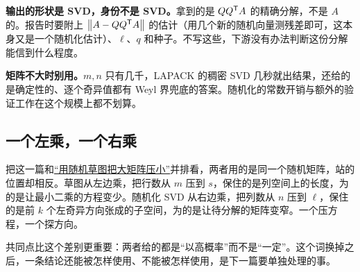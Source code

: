 \textbf{输出的形状是 SVD，身份不是 SVD。}拿到的是 \(QQ^{\mathsf{T}}A\) 的精确分解，不是 \(A\) 的。报告时要附上 \(\left\lVert A-QQ^{\mathsf{T}}A\right\rVert\) 的估计（用几个新的随机向量测残差即可，这本身又是一个随机化估计）、\(\ell\)、\(q\) 和种子。不写这些，下游没有办法判断这份分解能信到什么程度。

\textbf{矩阵不大时别用。}\(m,n\) 只有几千，LAPACK 的稠密 SVD 几秒就出结果，还给的是确定性的、逐个奇异值都有 Weyl 界兜底的答案。随机化的常数开销与额外的验证工作在这个规模上都不划算。

\subsection{一个左乘，一个右乘}

把这一篇和\hyperref[sec:08-Numerical-Analysis/05-Numerical-Linear-Algebra/08]{``用随机草图把大矩阵压小''}并排看，两者用的是同一个随机矩阵，站的位置却相反。草图从左边乘，把行数从 \(m\) 压到 \(s\)，保住的是列空间上的长度，为的是让最小二乘的方程变少。随机化 SVD 从右边乘，把列数从 \(n\) 压到 \(\ell\)，保住的是前 \(k\) 个左奇异方向张成的子空间，为的是让待分解的矩阵变窄。一个压方程，一个探方向。

共同点比这个差别更重要：两者给的都是``以高概率''而不是``一定''。这个词换掉之后，一条结论还能被怎样使用、不能被怎样使用，是下一篇要单独处理的事。
